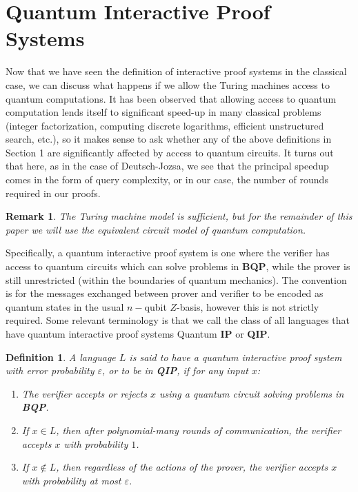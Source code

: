 \documentclass[12pt]{article}
\newtheorem{defn}{Definition}
\newtheorem{rmk}{Remark}
\numberwithin{thm}{section}
\numberwithin{defn}{section}
\numberwithin{prop}{section}
\numberwithin{rmk}{section}
\begin{document}
    \section{Quantum Interactive Proof Systems}
    Now that we have seen the definition of interactive proof systems in the classical case, we can discuss what happens if we allow the Turing machines access to quantum computations. It has been observed that allowing access to quantum computation lends itself to significant speed-up in many classical problems (integer factorization, computing discrete logarithms, efficient unstructured search, etc.), so it makes sense to ask whether any of the above definitions in Section 1 are significantly affected by access to quantum circuits. It turns out that here, as in the case of Deutsch-Jozsa, we see that the principal speedup comes in the form of query complexity, or in our case, the number of rounds required in our proofs.
   
    \begin{rmk}The Turing machine model is sufficient, but for the remainder of this paper we will use the equivalent circuit model of quantum computation. \end{rmk}
    
    Specifically, a quantum interactive proof system is one where the verifier has access to quantum circuits which can solve problems in \textbf{BQP}, while the prover is still unrestricted (within the boundaries of quantum mechanics). The convention is for the messages exchanged between prover and verifier to be encoded as quantum states in the usual $n-$qubit $Z$-basis, however this is not strictly required. Some relevant terminology is that we call the class of all languages that have quantum interactive proof systems Quantum \textbf{IP} or \textbf{QIP}.
    \begin{defn}
    	A language $L$ is said to have a quantum interactive proof system with error probability $\varepsilon$, or to be in \textbf{QIP}, if for any input $x$:
    	\begin{enumerate}
    		\item The verifier accepts or rejects $x$ using a quantum circuit solving problems in \textbf{BQP}.
    		\item If $x\in L$, then after polynomial-many rounds of communication, the verifier accepts $x$ with probability $1$.
    		\item If $x\notin L$, then regardless of the actions of the prover, the verifier accepts $x$ with probability  at most $\varepsilon$.
    	\end{enumerate}
    \end{defn}
\end{document}
